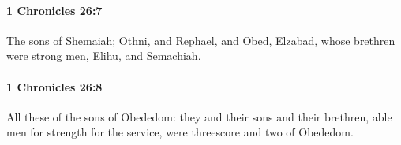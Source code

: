 		\paragraph{1 Chronicles 26:7} %
			\label{1CHRONICLES-26-7}

			The sons of Shemaiah; Othni, and Rephael, and Obed, Elzabad, whose brethren were strong men, Elihu, and Semachiah.


		\paragraph{1 Chronicles 26:8} %
			\label{1CHRONICLES-26-8}

			All these of the sons of Obededom: they and their sons and their brethren, able men for strength for the service, were threescore and two of Obededom.


